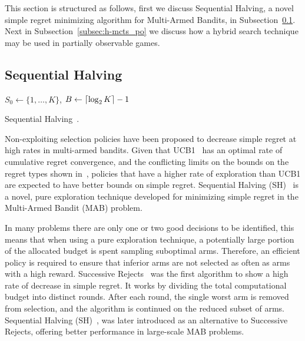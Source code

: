\documentclass[a4paper]{llncs}
\DeclarePairedDelimiter{\ceil}{\lceil}{\rceil}
\DeclarePairedDelimiter{\floor}{\lfloor}{\rfloor}
\begin{document}
This section is structured as follows, first we discuss Sequential Halving, a novel simple regret minimizing algorithm for Multi-Armed Bandits, in Subsection~\ref{subsec:seq_halving}. Next in Subsection~\ref{subsec:h-mcts_po} we discuss how a hybrid search technique may be used in partially observable games.

\subsection{Sequential Halving}
\label{subsec:seq_halving}

\IncMargin{1em}
\begin{algorithm2e}[b]
	\vspace{0.05cm}
	$S_0 \gets \{1,\dots,K\}$,
	$B \gets \ceil{\log_2{K}} - 1$														\;
	\BlankLine
  \caption[Sequential Halving]{Sequential Halving~\protect\cite{Karnin13SH}. \label{alg:seqhalv}}
\end{algorithm2e}
\DecMargin{1em}

Non-exploiting selection policies have been proposed to decrease simple regret at high rates in multi-armed bandits. Given that UCB1~\cite{auer2002using} has an optimal rate of cumulative regret convergence, and the conflicting limits on the bounds on the regret types shown in~\cite{Bubeck11Pure}, policies that have a higher rate of exploration than UCB1 are expected to have better bounds on simple regret. Sequential Halving (SH)~\cite{Karnin13SH} is a novel, pure exploration technique developed for minimizing simple regret in the Multi-Armed Bandit (MAB) problem.

In many problems there are only one or two good decisions to be identified, this means that when using a pure exploration technique, a potentially large portion of the allocated budget is spent sampling suboptimal arms. Therefore, an efficient policy is required to ensure that inferior arms are not selected as often as arms with a high reward. Successive Rejects~\cite{audibert2010best} was the first algorithm to show a high rate of decrease in simple regret. It works by dividing the total computational budget into distinct rounds. After each round, the single worst arm is removed from selection, and the algorithm is continued on the reduced subset of arms. Sequential Halving (SH)~\cite{Karnin13SH}, was later introduced as an alternative to Successive Rejects, offering better performance in large-scale MAB problems.
\end{document}
